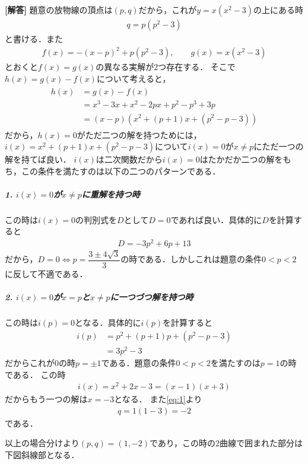 \documentclass[../../main.tex]{subfiles}
\begin{document}
\begin{oframed}
  
\end{oframed}

{\bf [解答]}
題意の放物線の頂点は$(p,q)$だから，これが$y=x(x^2-3)$の上にある時
\begin{align}
  q = p(p^2-3) \label{eq:1}
\end{align}
と書ける．また
\begin{align}
  f(x)=-(x-p)^2+p(p^2-3), \qquad g(x)=x(x^2-3) \label{eq:2}
\end{align}
とおくと$f(x)=g(x)$の異なる実解が2つ存在する．
そこで$h(x)=g(x)-f(x)$について考えると，
\begin{align}
  \begin{split}
    h(x)
    &=g(x)-f(x) \\
    &=x^3-3x+x^2-2px+p^2-p^3+3p \\
    &=(x-p)\left(x^2+(p+1)x+(p^2-p-3)\right)
  \end{split}\label{eq:3}
\end{align}
だから，$h(x)=0$がただ二つの解を持つためには，$i(x)=x^2+(p+1)x+(p^2-p-3)$について$i(x)=0$が$x\neq p$にただ一つの解を持てば良い．
$i(x)$は二次関数だから$i(x)=0$はたかだか二つの解をもち，この条件を満たすのは以下の二つのパターンである．

\subparagraph{1.  $i(x)=0$が$x\ne p$に重解を持つ時}

この時は$i(x)=0$の判別式を$D$として$D=0$であれば良い．具体的に$D$を計算すると
\begin{align}
  D=-3p^2+6p+13
\end{align}
だから，$D=0\iff p=\dfrac{3\pm4\sqrt{3}}{3}$の時である．しかしこれは題意の条件$0<p<2$に反して不適である．

\subparagraph{2.  $i(x)=0$が$x=p$と$x\neq p$に一つづつ解を持つ時}

この時は$i(p)=0$となる．具体的に$i(p)$を計算すると
\begin{align}
  i(p)
  &= p^2+(p+1)p+(p^2-p-3) \\
  &= 3p^2-3
\end{align}
だからこれが$0$の時$p=\pm 1$である．題意の条件$0<p<2$を満たすのは$p=1$の時である．
この時
\begin{align}
  i(x) = x^2 +2x - 3 = (x-1)(x+3)
\end{align}
だからもう一つの解は$x=-3$となる．
また\cref{eq:1}より
\begin{align}
  q = 1(1-3) = -2
\end{align}
である．

以上の場合分けより$(p,q)=(1,-2)$であり，この時の2曲線で囲まれた部分は下図斜線部となる．
\end{document}
